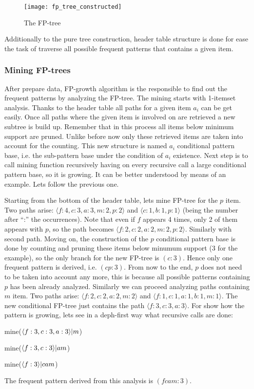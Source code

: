 \begin{figure}
  \centering
  \texttt{[image: fp\_tree\_constructed]}
  \caption{The FP-tree}
  \label{fig:fp_tree_constructed}
\end{figure}

Additionally to the pure tree construction, header table structure is done for
ease the task of traverse all possible frequent patterns that contains a given
item. 

\subsubsection{Mining FP-trees}

After prepare data, FP-growth algorithm is the responsible to find out the
frequent patterns by analyzing the FP-tree. The mining starts with 1-itemset
analysis. Thanks to the header table all paths for a given item $a_{i}$ can be get
easily. Once all paths where the given item is involved on are retrieved a new 
subtree is build up. Remember that in this process all items below minimum support 
are pruned. Unlike before now only these retrieved items are taken into account 
for the counting. This new structure is named $a_{i}$ conditional pattern base,
i.e. the sub-pattern base under the condition of $a_{i}$ existence. Next step is
to call mining function recursively having on every recursive call a large
conditional pattern base, so it is growing. It can be better understood by means
of an example. Lets follow the previous one.

Starting from the bottom of the header table, lets mine FP-tree for the $p$ item. Two
paths arise: $\langle f:4,c:3,a:3,m:2,p:2 \rangle$ and $\langle c:1, b:1, p:1
\rangle$ (being the number after ``:'' the occurrences). Note that even if $f$
appears 4 times, only 2 of them appears with $p$, so the path becomes $\langle 
f:2,c:2,a:2,m:2,p:2 \rangle$. Similarly with second path. Moving on, the
construction of the $p$ conditional pattern base is done by counting and pruning
these items below minumum support (3 for the example), so the only branch for the new FP-tree is
$(c:3)$. Hence only one frequent pattern is derived, i.e. $(cp:3)$. From now to
the end, $p$ does not need to be taken into account any more, this is because
all possible patterns containing $p$ has been already analyzed. Similarly we can proceed analyzing paths containing $m$ item. Two paths arise: 
$\langle f:2,c:2,a:2,m:2 \rangle$ and $\langle f:1,c:1,a:1,b:1,m:1 \rangle$. The
new conditional FP-tree just contains the path $\langle f:3,c:3,a:3 \rangle$.
For show how the pattern is growing, lets see in a deph-first way what
recursive calls are done:
\begin{enumerate*}[label=(\roman*)]
  \item mine($\langle f:3,c:3,a:3 \rangle \text{\textbar} m$)
  \item mine($\langle f:3,c:3 \rangle \text{\textbar} am$)
  \item mine($\langle f:3 \rangle \text{\textbar} cam$)
\end{enumerate*}
The frequent pattern derived from this analysis is $(fcam:3)$.

